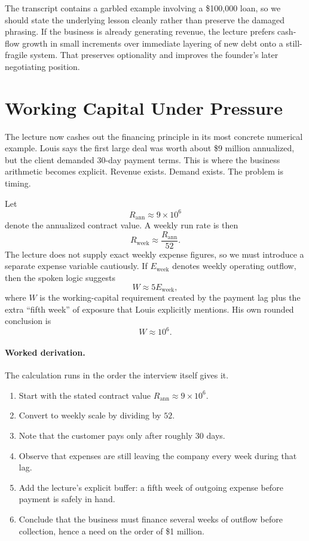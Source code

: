 The transcript contains a garbled example involving a \$100{,}000 loan, so we should state the underlying lesson cleanly rather than preserve the damaged phrasing. If the business is already generating revenue, the lecture prefers cash-flow growth in small increments over immediate layering of new debt onto a still-fragile system. That preserves optionality and improves the founder's later negotiating position.

\section{Working Capital Under Pressure}

The lecture now cashes out the financing principle in its most concrete numerical example. Louis says the first large deal was worth about \$9 million annualized, but the client demanded 30-day payment terms. This is where the business arithmetic becomes explicit. Revenue exists. Demand exists. The problem is timing.

Let
\begin{equation}
R_{\mathrm{ann}} \approx 9\times 10^6
\end{equation}
denote the annualized contract value. A weekly run rate is then
\begin{equation}
R_{\mathrm{week}} \approx \frac{R_{\mathrm{ann}}}{52}.
\end{equation}
The lecture does not supply exact weekly expense figures, so we must introduce a separate expense variable cautiously. If \(E_{\mathrm{week}}\) denotes weekly operating outflow, then the spoken logic suggests
\begin{equation}
W \approx 5E_{\mathrm{week}},
\end{equation}
where \(W\) is the working-capital requirement created by the payment lag plus the extra ``fifth week'' of exposure that Louis explicitly mentions. His own rounded conclusion is
\begin{equation}
W \approx 10^6.
\end{equation}

\paragraph{Worked derivation.}
The calculation runs in the order the interview itself gives it.
\begin{enumerate}
\item Start with the stated contract value \(R_{\mathrm{ann}} \approx 9\times 10^6\).
\item Convert to weekly scale by dividing by \(52\).
\item Note that the customer pays only after roughly \(30\) days.
\item Observe that expenses are still leaving the company every week during that lag.
\item Add the lecture's explicit buffer: a fifth week of outgoing expense before payment is safely in hand.
\item Conclude that the business must finance several weeks of outflow before collection, hence a need on the order of \$1 million.
\end{enumerate}

